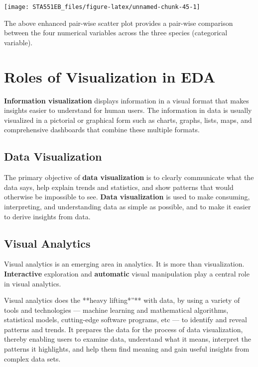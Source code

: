 \documentclass[
]{book}
\begin{document}
\begin{center}\texttt{[image: STA551EB\_files/figure-latex/unnamed-chunk-45-1]} \end{center}

The above enhanced pair-wise scatter plot provides a pair-wise comparison between the four numerical variables across the three species (categorical variable).

\hfill\break

\hypertarget{roles-of-visualization-in-eda}{%
\section{Roles of Visualization in EDA}\label{roles-of-visualization-in-eda}}

\textbf{Information visualization} displays information in a visual format that makes insights easier to understand for human users. The information in data is usually visualized in a pictorial or graphical form such as charts, graphs, lists, maps, and comprehensive dashboards that combine these multiple formats.

\hypertarget{data-visualization}{%
\subsection{Data Visualization}\label{data-visualization}}

The primary objective of \textbf{data visualization} is to clearly communicate what the data says, help explain trends and statistics, and show patterns that would otherwise be impossible to see. \textbf{Data visualization} is used to make consuming, interpreting, and understanding data as simple as possible, and to make it easier to derive insights from data.

\hypertarget{visual-analytics}{%
\subsection{Visual Analytics}\label{visual-analytics}}

Visual analytics is an emerging area in analytics. It is more than visualization. \textbf{Interactive} exploration and \textbf{automatic} visual manipulation play a central role in visual analytics.

Visual analytics does the **heavy lifting*''** with data, by using a variety of tools and technologies --- machine learning and mathematical algorithms, statistical models, cutting-edge software programs, etc --- to identify and reveal patterns and trends. It prepares the data for the process of data visualization, thereby enabling users to examine data, understand what it means, interpret the patterns it highlights, and help them find meaning and gain useful insights from complex data sets.
\end{document}
